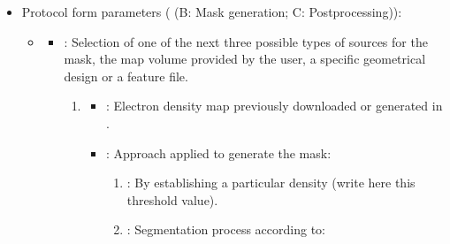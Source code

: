 \begin{itemize}
 \item Protocol form parameters ( (B: Mask generation; C: Postprocessing)):
  
    
    \begin{itemize}
        \item {}
            \begin{itemize}
                \item {}: Selection of one of the next three possible types of sources for the mask, the map volume provided by the user, a specific geometrical design or a feature file.
                \begin{enumerate}
                    \item {}
                            \begin{itemize}
                            \item {}: Electron density map previously downloaded or generated in \scipion.
                            \item {}: Approach applied to generate the mask:
                                 \begin{enumerate}
                                    \item {}: By establishing a particular density  (write here this threshold value).   
                                    \item {}: Segmentation process according to:
      

\end{enumerate}
\end{itemize}
\end{enumerate}
\end{itemize}
\end{itemize}
\end{itemize}
